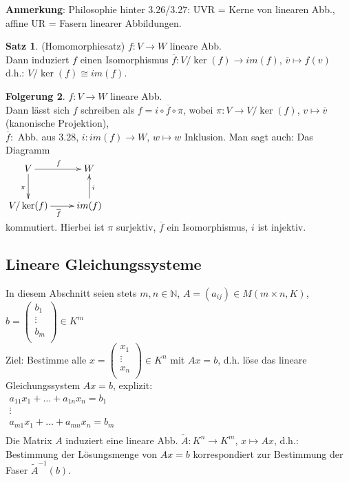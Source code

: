 \documentclass[10pt,a4paper,numbers=endperiod]{scrartcl}
\theoremstyle{definition}
\newtheorem{satz}{Satz}[section]
\newtheorem{folg}[satz]{Folgerung}
\def\NN{{\mathbb N}}
\begin{document}
\textbf{Anmerkung}: Philosophie hinter 3.26/3.27: UVR = Kerne von linearen Abb., affine UR = Fasern linearer Abbildungen.

\begin{satz}
	(Homomorphiesatz) $f: V \rightarrow W$ lineare Abb.\\
	Dann induziert $f$ einen Isomorphismus $\overline{f}: V/\ker(f) \rightarrow im(f)$, $\overline{v} \mapsto f(v)$\\
	d.h.: $V/\ker(f) \cong im(f)$. 
\end{satz}

\begin{folg}
	$f: V\rightarrow W$ lineare Abb.\\
	Dann lässt sich $f$ schreiben als $f = i \circ \overline{f} \circ \pi$, wobei $\pi: V \rightarrow V/\ker(f)$, $v\mapsto \overline{v}$ (kanonische Projektion),\\ $\overline{f}:$ Abb. aus 3.28, $i: im(f) \rightarrow W$, $w \mapsto w$ Inklusion. Man sagt auch: Das Diagramm\\ $\begin{xy}
		\xymatrix{
			V \ar[r]^f \ar[d]_\pi    &   W  \\
			V/\ker(f) \ar[r]_{\overline{f}}  &   im(f) \ar[u]_i
		}
	\end{xy}$\\ kommutiert. Hierbei ist $\pi$ surjektiv, $\overline{f}$ ein Isomorphismus, $i$ ist injektiv.
\end{folg}

\subsection{Lineare Gleichungssysteme}
In diesem Abschnitt seien stets $m,n \in \NN$, $A=(a_{ij}) \in M(m\times n, K)$, $b = \begin{pmatrix}
b_1\\ \vdots\\b_m\\
\end{pmatrix}\in K^m$\\
Ziel: Bestimme alle $x = \begin{pmatrix}
x_1\\ \vdots\\x_n\\
\end{pmatrix}\in K^n$ mit $Ax=b$, d.h. löse das lineare Gleichungssystem $Ax=b$, explizit:\\
$\begin{array}{c}
a_{11}x_1+\ldots+a_{1n}x_n=b_1\\
\vdots\\
a_{m1}x_1+\ldots+a_{mn}x_n=b_m\\
\end{array}$\\
Die Matrix $A$ induziert eine lineare Abb. $\tilde{A}: K^n \rightarrow K^m$, $x \mapsto Ax$, d.h.: Bestimmung der Lösungsmenge von $Ax=b$ korrespondiert zur Bestimmung der Faser $\tilde{A}^{-1}(b)$.
\end{document}
